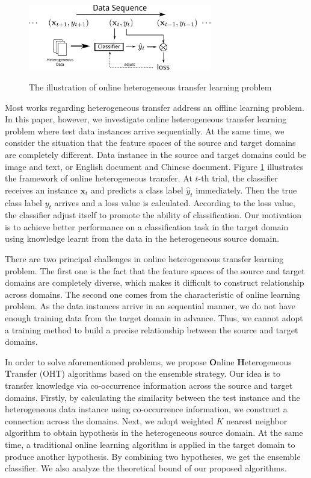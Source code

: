 \documentclass{article} %
\theoremstyle{remark}
\theoremstyle{definition}
\begin{document}
\begin{figure}[H]
\centering
  \includegraphics[width=8cm]{problem.pdf}
  \label{problem}
  \caption{The illustration of online heterogeneous transfer learning problem}
\end{figure}

Most works regarding heterogeneous transfer address an offline learning problem.
In this paper, however, we investigate online heterogeneous transfer learning problem where test data instances arrive sequentially.
At the same time, we consider the situation that the feature spaces of the source and target domains are completely different.
Data instance in the source and target domains could be image and text, or English document and Chinese document.
Figure \ref{problem} illustrates the framework of online heterogeneous transfer.
At $t$-th trial, the classifier receives an instance $\mathbf{x}_t$ and predicts a class label $\hat{y}_t$ immediately.
Then the true class label $y_t$ arrives and a loss value is calculated.
According to the loss value, the classifier adjust itself to promote the ability of classification.
Our motivation is to achieve better performance on a classification task in the target domain using knowledge learnt from the data in the heterogeneous source domain.

There are two principal challenges in online heterogeneous transfer learning problem.
The first one is the fact that the feature spaces of the source and target domains are completely diverse, which makes it difficult to construct relationship across domains.
The second one comes from the characteristic of online learning problem.
As the data instances arrive in an sequential manner, we do not have enough training data from the target domain in advance.
Thus, we cannot adopt a training method to build a precise relationship between the source and target domains.

In order to solve aforementioned problems, we propose \textbf{O}nline \textbf{H}eterogeneous \textbf{T}ransfer (OHT) algorithms based on the ensemble strategy.
Our idea is to transfer knowledge via co-occurrence information across the source and target domains.
Firstly, by calculating the similarity between the test instance and the heterogeneous data instance using co-occurrence information, we construct a connection across the domains.
Next, we adopt weighted $K$ nearest neighbor algorithm to obtain hypothesis in the heterogeneous source domain.
At the same time, a traditional online learning algorithm is applied in the target domain to produce another hypothesis.
By combining two hypotheses, we get the ensemble classifier.
We also analyze the theoretical bound of our proposed algorithms.
\end{document}
